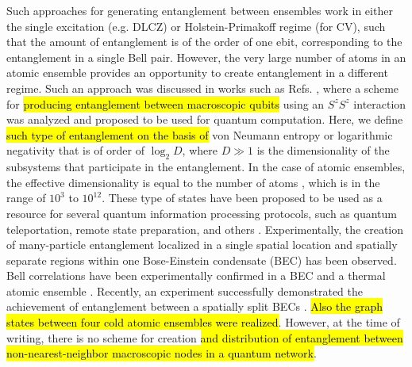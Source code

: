 \documentclass[%
  prx,%
  twocolumn,%
  preprintnumbers,%
  amsmath,%
  amssymb,%
  superscriptaddress%
]{revtex4}
\begin{document}
Such approaches for generating entanglement between ensembles work in either the single excitation  (e.g.  DLCZ) or Holstein-Primakoff regime (for CV), such that the amount of entanglement is of the order of one ebit, corresponding to the entanglement in a single Bell pair.  However, the very large number of atoms in an atomic ensemble provides an opportunity to create entanglement in a different regime.%
Such an approach was discussed in works such as Refs. \cite{byrnes2013fractality,pyrkov2013entanglement,rosseau2014,byrnes2012macroscopic,hussain2014geometric}, where a scheme for \hl{producing entanglement between macroscopic qubits} using an $ S^z S^z$ interaction was analyzed and proposed to be used for quantum computation. Here, we define \hl{such type of entanglement on the basis of} von Neumann entropy or logarithmic negativity that is of order of $ \log_2 D $, where $ D \gg 1  $ is the dimensionality of the subsystems that participate in the entanglement.  In the case of atomic ensembles, the effective dimensionality is equal to the number of atoms \cite{byrnes2020quantum}, which is in the range of $ 10^3 $ to $ 10^{12} $.   These type of states have been proposed to be used as a resource for several quantum information processing protocols, such as quantum teleportation, remote state preparation, and others \cite{pyrkov2014full,byrnes2015macroscopic,manish2021,byrnes2011accelerated}. Experimentally,
the creation of many-particle entanglement localized in a single spatial location \cite{schmied2016bell} and spatially separate regions \cite{fadel2018spatial} within one Bose-Einstein condensate (BEC) has been observed.
Bell correlations have been experimentally confirmed in a BEC \cite{schmied2016bell} and a thermal atomic ensemble \cite{engelsen2017}. Recently, an experiment successfully demonstrated the achievement of entanglement between a spatially split BECs \cite{Colciaghi2023}. \hl{Also the graph states between four cold atomic ensembles were realized}\cite{cooper24}. However, at the time of writing, there is no scheme for creation \hl{and distribution of  entanglement between non-nearest-neighbor macroscopic nodes in a quantum network}.
\end{document}
